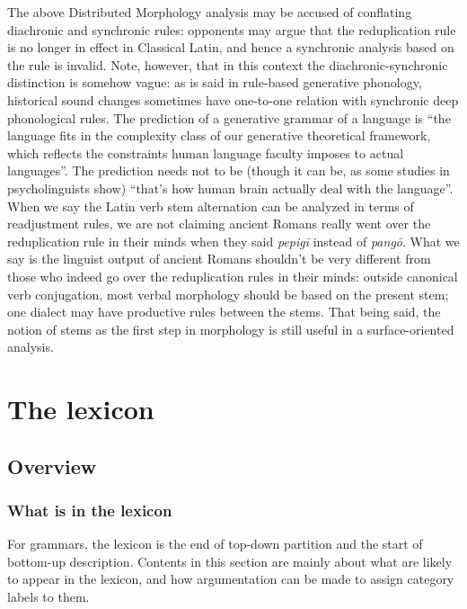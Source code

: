 \documentclass[UTF8, a4paper, oneside, scheme=plain]{ctexart}
\newcommand*{\corpus}[1]{\emph{#1}}
\begin{document}
The above Distributed Morphology analysis may be accused of 
conflating diachronic and synchronic rules:
opponents may argue that the reduplication rule is no longer in effect 
in Classical Latin,
and hence a synchronic analysis based on the rule is invalid.
Note, however, that in this context the diachronic-synchronic distinction is somehow vague:
as is said in rule-based generative phonology,
historical sound changes sometimes have one-to-one relation with synchronic deep phonological rules.
The prediction of a generative grammar of a language is
``the language fits in the complexity class of our generative theoretical framework,
which reflects the constraints human language faculty imposes to actual languages''.
The prediction needs not to be (though it can be, as some studies in psycholinguists show)
``that's how human brain actually deal with the language''.
When we say the Latin verb stem alternation can be analyzed in terms of readjustment rules,
we are not claiming ancient Romans really went over the reduplication rule in their minds
when they said \corpus{pepigī} instead of \corpus{pangō}.
What we say is the linguist output of ancient Romans shouldn't be very different 
from those who indeed go over the reduplication rules in their minds:
outside canonical verb conjugation, most verbal morphology should be based on the present stem;
one dialect may have productive rules between the stems.
That being said, the notion of stems as the first step in morphology 
is still useful in a surface-oriented analysis. 

\section{The lexicon}\label{sec:lexicon}

\subsection{Overview}

\subsubsection{What is in the lexicon}\label{sec:lexicon-content}

For grammars, the lexicon is the end of top-down partition
and the start of bottom-up description.
Contents in this section are mainly about what are likely to appear in the lexicon,
and how argumentation can be made to assign category labels to them.
\end{document}
